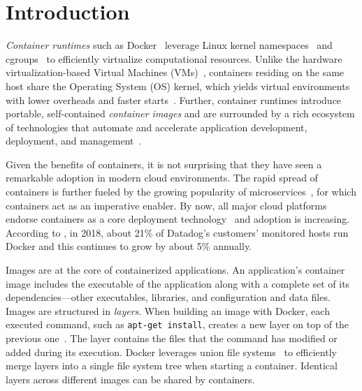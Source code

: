 \section{Introduction}
\label{sec:intro}

%
%
%
%
%
%
%


\emph{Container runtimes} such as Docker~\cite{docker} 
leverage Linux kernel namespaces~\cite{namespaces} and cgroups~\cite{cgroups}
to efficiently virtualize computational resources.
%
Unlike the hardware virtualization-based Virtual Machines
(VMs)~\cite{adams2006comparison}, containers residing on the same host share
the Operating System (OS) kernel, which yields virtual environments with
lower overheads and faster starts~\cite{7819678}.
%
Further, container runtimes introduce portable, self-contained \emph{container
images} and are surrounded by a rich ecosystem of technologies that automate
and accelerate application development, deployment, and
management~\cite{cncfprojects}.

Given the benefits of containers, it is not surprising that they have seen a
remarkable adoption in modern cloud environments.
%
The rapid spread of containers is further fueled by the growing popularity of
microservices~\cite{wolff2016microservices},
for which containers act as an imperative enabler.
%
By now, all major cloud platforms endorse containers as a core deployment
technology~\cite{googlecengine,azurec,ibmkube,awscont} and adoption
is increasing.
%
According to \cite{20percentdocker}, in 2018, about 21\% of Datadog's customers' monitored hosts run Docker and this continues to grow by about 5\% annually.


Images are at the core of containerized applications.
%
An application's container image includes the executable of the application
along with a complete set of its dependencies---other executables, libraries, and
configuration and data files.
%
Images are structured in \emph{layers}. When building an image with Docker, each
executed command, such as \texttt{apt-get install}, creates a new layer on
top of the previous one~\cite{dockerfile}.
%
The layer contains the files that the command has modified or added during its
execution.
%
%
Docker leverages union file systems~\cite{docker-driver-eval} to
efficiently merge layers into a single file system tree when starting a container.
%
Identical layers across different images can be shared by containers.

